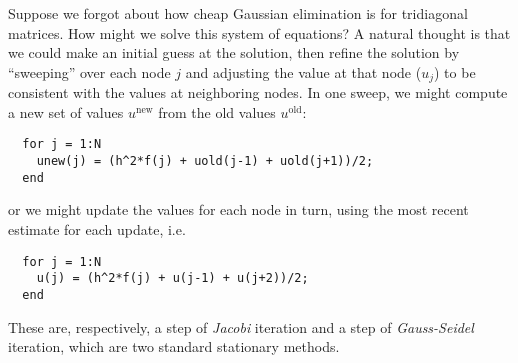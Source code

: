 \documentclass[12pt, leqno]{article}
\begin{document}
Suppose we forgot about how cheap Gaussian elimination is for
tridiagonal matrices.  How might we solve this system of equations?
A natural thought is that we could make an initial guess at the
solution, then refine the solution by ``sweeping'' over each node $j$
and adjusting the value at that node ($u_j$) to be consistent with
the values at neighboring nodes.  In one sweep, we might compute
a new set of values $u^{\mathrm{new}}$ from the old values $u^{\mathrm{old}}$:
\begin{lstlisting}
  for j = 1:N
    unew(j) = (h^2*f(j) + uold(j-1) + uold(j+1))/2;
  end
\end{lstlisting}
or we might update the values for each node in turn, using the most
recent estimate for each update, i.e.
\begin{lstlisting}
  for j = 1:N
    u(j) = (h^2*f(j) + u(j-1) + u(j+2))/2;
  end
\end{lstlisting}
These are, respectively, a step of {\em Jacobi} iteration and a step
of {\em Gauss-Seidel} iteration, which are two standard stationary
methods.
\end{document}
